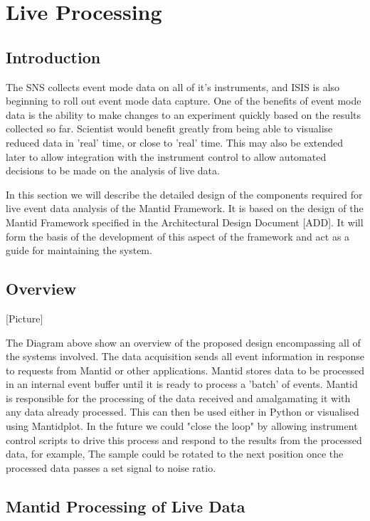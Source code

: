 \setcounter{secnumdepth}{5}

\section{Live Processing}

\subsection{Introduction}

The SNS collects event mode data on all of it's instruments, and ISIS is also beginning to roll out event mode data capture.  One of the benefits of event mode data is the ability to make changes to an experiment quickly based on the results collected so far.  Scientist would benefit greatly from being able to visualise reduced data in 'real' time, or close to 'real' time.  This may also be extended later to allow integration with the instrument control to allow automated decisions to be made on the analysis of live data.

In this section we will describe the detailed design of the components required for live event data analysis of the Mantid Framework.  It is based on the design of the Mantid Framework specified in the Architectural Design Document [ADD].
It will form the basis of the development of this aspect of the framework and act as a guide for maintaining the system.

\subsection{Overview}

[Picture]

The Diagram above show an overview of the proposed design encompassing all of the systems involved.  The data acquisition sends all event information in response to requests from Mantid or other applications.  Mantid stores data to be processed in an internal event buffer  until it is ready to process a 'batch' of events.  Mantid is responsible for the processing of the data received and amalgamating it with any data already processed.  This can then be used either in Python or visualised using Mantidplot.  In the future we could "close the loop" by allowing instrument control scripts to drive this process and respond to the results from the processed data, for example, The sample could be rotated to the next position once the processed data passes a set signal to noise ratio.

\subsection{Mantid Processing of Live Data}

